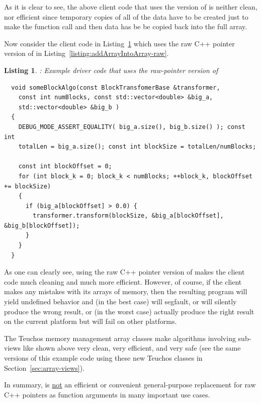 \documentclass[pdf,ps2pdf,11pt]{SANDreport}
\newtheorem{listing}{Listing}
\begin{document}
As it is clear to see, the above client code that uses the
{} version of {} is
neither clean, nor efficient since temporary copies of all of the data
have to be created just to make the function call and then data has be
be copied back into the full array.

Now consider the client code in
Listing~\ref{listing:someBlockAlgo-std-vector-raw-ptr} which uses the
raw C++ pointer version of {} in
Listing~\ref{listing:addArrayIntoArray-raw}.

{}\begin{listing}: Example driver code that uses the raw-pointer
version of {}
\label{listing:someBlockAlgo-std-vector-raw-ptr}
{\small\begin{verbatim}
  void someBlockAlgo(const BlockTransfomerBase &transformer,
    const int numBlocks, const std::vector<double> &big_a,
    std::vector<double> &big_b )
  {
    DEBUG_MODE_ASSERT_EQUALITY( big_a.size(), big_b.size() ); const int
    totalLen = big_a.size(); const int blockSize = totalLen/numBlocks;
    
    const int blockOffset = 0;
    for (int block_k = 0; block_k < numBlocks; ++block_k, blockOffset += blockSize)
    {
      if (big_a[blockOffset] > 0.0) {
        transformer.transform(blockSize, &big_a[blockOffset], &big_b[blockOffset]);
      }
    }
  }
\end{verbatim}}
\end{listing}

As one can clearly see, using the raw C++ pointer version of
{} makes the client code much cleaning and much
more efficient.  However, of course, if the client makes any mistakes
with its arrays of memory, then the resulting program will yield
undefined behavior and (in the best case) will segfault, or will
silently produce the wrong result, or (in the worst case) actually
produce the right result on the current platform but will fail on
other platforms.

The Teuchos memory management array classes make algorithms involving
sub-views like shown above very clean, very efficient, and very safe
(see the same versions of this example code using these new Teuchos
classes in Section~\ref{sec:array-views}).

In summary, {} is {}\underline{not} an efficient
or convenient general-purpose replacement for raw C++ pointers as
function arguments in many important use cases.
\end{document}
